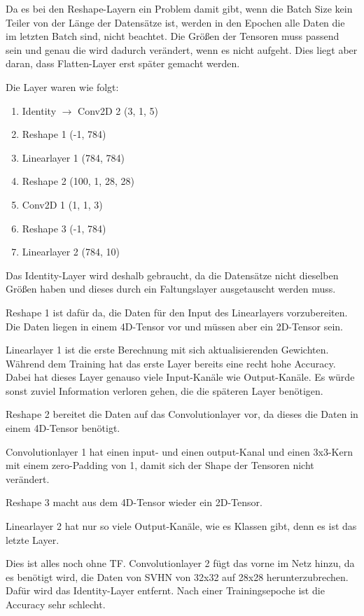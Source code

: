     Da es bei den Reshape-Layern ein Problem damit gibt, wenn die Batch Size kein Teiler 
    von der Länge der Datensätze ist, werden in den Epochen alle Daten die im letzten Batch 
    sind, nicht beachtet. Die Größen der Tensoren muss passend sein und genau die wird 
    dadurch verändert, wenn es nicht aufgeht. Dies liegt aber daran, dass Flatten-Layer 
    erst später gemacht werden.

    Die Layer waren wie folgt: 
    \begin{enumerate}
        \item Identity $\rightarrow$ Conv2D 2 (3, 1, 5)
        \item Reshape 1 (-1, 784)
        \item Linearlayer 1 (784, 784)
        \item Reshape 2 (100, 1, 28, 28)
        \item Conv2D 1 (1, 1, 3)
        \item Reshape 3 (-1, 784)
        \item Linearlayer 2 (784, 10)
    \end{enumerate}

    Das Identity-Layer wird deshalb gebraucht, da die Datensätze nicht 
    dieselben Größen haben und dieses durch ein Faltungslayer ausgetauscht 
    werden muss.

    Reshape 1 ist dafür da, die Daten für den Input des Linearlayers vorzubereiten. 
    Die Daten liegen in einem 4D-Tensor vor und müssen aber ein 2D-Tensor sein. 

    Linearlayer 1 ist die erste Berechnung mit sich aktualisierenden Gewichten. 
    Während dem Training hat das erste Layer bereits eine recht hohe Accuracy. 
    Dabei hat dieses Layer genauso viele Input-Kanäle wie Output-Kanäle. 
    Es würde sonst zuviel Information verloren gehen, die die späteren Layer benötigen.

    Reshape 2 bereitet die Daten auf das Convolutionlayer vor, da dieses die Daten 
    in einem 4D-Tensor benötigt.

    Convolutionlayer 1 hat einen input- und einen output-Kanal und einen 3x3-Kern 
    mit einem zero-Padding von 1, damit sich der Shape der Tensoren nicht verändert. 

    Reshape 3 macht aus dem 4D-Tensor wieder ein 2D-Tensor.

    Linearlayer 2 hat nur so viele Output-Kanäle, wie es Klassen gibt, denn es 
    ist das letzte Layer. 

    Dies ist alles noch ohne TF.
    Convolutionlayer 2 fügt das vorne im Netz hinzu, da es benötigt wird, die 
    Daten von SVHN von 32x32 auf 28x28 herunterzubrechen. Dafür wird das Identity-Layer 
    entfernt. Nach einer Trainingsepoche ist die Accuracy sehr schlecht.

